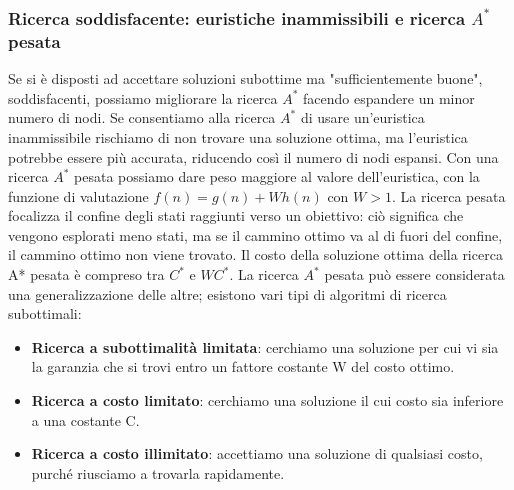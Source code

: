 \documentclass{article}
\begin{document}
\subsubsection{Ricerca soddisfacente: euristiche inammissibili e ricerca $A^*$ pesata}
Se si è disposti ad accettare soluzioni subottime ma "sufficientemente buone", soddisfacenti, possiamo migliorare la ricerca $A^*$ facendo espandere un minor numero di nodi. Se consentiamo alla ricerca $A^*$ di usare un'euristica inammissibile rischiamo di non trovare una soluzione ottima, ma l'euristica potrebbe essere più accurata, riducendo così il numero di nodi espansi.
Con una ricerca $A^*$ pesata possiamo dare peso maggiore al valore dell'euristica, con la funzione di valutazione $f(n)=g(n)+Wh(n)$ con $W > 1$. La ricerca pesata focalizza il confine degli stati raggiunti verso un obiettivo: ciò significa che vengono esplorati meno stati, ma se il cammino ottimo va al di fuori del confine, il cammino ottimo non viene trovato. Il costo della soluzione ottima della ricerca A* pesata è compreso tra $C^*$ e $WC^*$. La ricerca $A^*$ pesata può essere considerata una generalizzazione delle altre; esistono vari tipi di algoritmi di ricerca subottimali:
\begin{itemize}
    \item \textbf{Ricerca a subottimalità limitata}: cerchiamo una soluzione per cui vi sia la garanzia che si trovi entro un fattore costante W del costo ottimo.
    \item \textbf{Ricerca a costo limitato}: cerchiamo una soluzione il cui costo sia inferiore a una costante C.
    \item \textbf{Ricerca a costo illimitato}: accettiamo una soluzione di qualsiasi costo, purché riusciamo a trovarla rapidamente.
\end{itemize}
\newpage
\end{document}
